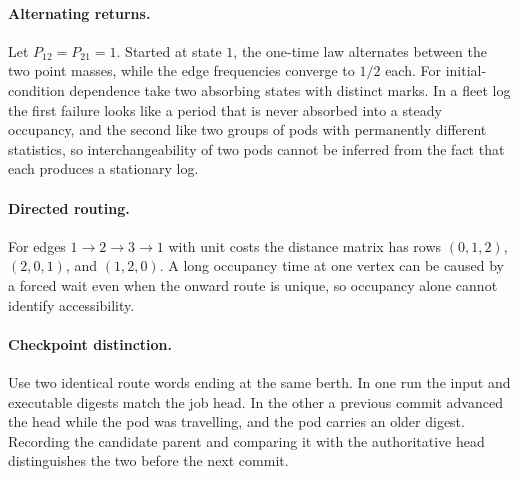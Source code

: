 \documentclass[11pt,openany]{book}
\theoremstyle{plain}
\theoremstyle{definition}
\theoremstyle{remark}
\begin{document}
\paragraph{Alternating returns.} Let $P_{12}=P_{21}=1$. Started at state $1$, the one-time law alternates between the two point masses, while the edge frequencies converge to $1/2$ each. For initial-condition dependence take two absorbing states with distinct marks. In a fleet log the first failure looks like a period that is never absorbed into a steady occupancy, and the second like two groups of pods with permanently different statistics, so interchangeability of two pods cannot be inferred from the fact that each produces a stationary log.

\paragraph{Directed routing.} For edges $1\to2\to3\to1$ with unit costs the distance matrix has rows $(0,1,2)$, $(2,0,1)$, and $(1,2,0)$. A long occupancy time at one vertex can be caused by a forced wait even when the onward route is unique, so occupancy alone cannot identify accessibility.

\paragraph{Checkpoint distinction.} Use two identical route words ending at the same berth. In one run the input and executable digests match the job head. In the other a previous commit advanced the head while the pod was travelling, and the pod carries an older digest. Recording the candidate parent and comparing it with the authoritative head distinguishes the two before the next commit.
\end{document}
